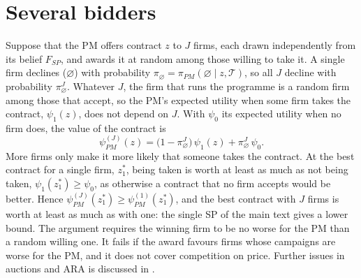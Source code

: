 \documentclass[12pt]{article}
\begin{document}
\section{Several bidders}\label{app:bidders}
Suppose that the PM offers contract $z$ to $J$ firms, each drawn independently from its belief $F_{SP}$, and awards it at random among those willing to take it. A single firm declines ($\varnothing$) with probability $\pi_\varnothing = \pi_{PM}(\varnothing \mid z, \mathcal{T})$, so all $J$ decline with probability $\pi_\varnothing^{J}$. Whatever $J$, the firm that runs the programme is a random firm among those that accept, so the PM's expected utility when some firm takes the contract, $\psi_1(z)$, does not depend on $J$. With $\psi_0$ its expected utility when no firm does, the value of the contract is
\begin{equation}\label{eq:bidders}
\psi^{(J)}_{PM}(z) = \big(1 - \pi_\varnothing^{J}\big)\, \psi_1(z) + \pi_\varnothing^{J}\, \psi_0 .
\end{equation}
More firms only make it more likely that someone takes the contract. At the best contract for a single firm, $z^*_1$, being taken is worth at least as much as not being taken, $\psi_1(z^*_1) \geq \psi_0$, as otherwise a contract that no firm accepts would be better. Hence $\psi^{(J)}_{PM}(z^*_1) \geq \psi^{(1)}_{PM}(z^*_1)$, and the best contract with $J$ firms is worth at least as much as with one: the single SP of the main text gives a lower bound. The argument requires the winning firm to be no worse for the PM than a random willing one. It fails if the award favours firms whose campaigns are worse for the PM, and it does not cover competition on price. Further issues in auctions and ARA is discussed in \citet{banks2015adversarial}.





\end{document}
